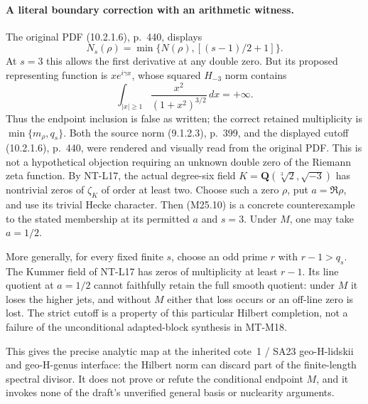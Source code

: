 \paragraph{A literal boundary correction with an arithmetic witness.}
The original PDF (10.2.1.6), p.~440, displays
\[
 N_s(\rho)=\min\{N(\rho),[(s-1)/2+1]\}.
\]
At $s=3$ this allows the first derivative at any double zero.
But its proposed representing function is
$x e^{i\gamma x}$, whose squared $H_{-3}$ norm contains
\[
              \int_{|x|\ge1}\frac{x^2}{(1+x^2)^{3/2}}\,dx
                         =+\infty.
 \tag{M25.10}
\]
Thus the endpoint inclusion is false as written; the
correct retained multiplicity is
$\min\{m_\rho,q_s\}$. Both the source norm (9.1.2.3),
p.~399, and the displayed cutoff (10.2.1.6), p.~440, were
rendered and visually read from the original PDF.
This is not a hypothetical objection requiring an unknown
double zero of the Riemann zeta function. By NT-L17,
the actual degree-six field
$K=\mathbf Q(\sqrt[3]{2},\sqrt{-3})$ has nontrivial zeros
of $\zeta_K$ of order at least two. Choose such a zero
$\rho$, put $a=\Re\rho$, and use its trivial Hecke
character. Then (M25.10) is a concrete counterexample
to the stated membership at its permitted $a$ and $s=3$.
Under $M$, one may take $a=1/2$.

More generally, for every fixed finite $s$, choose an odd
prime $r$ with $r-1>q_s$. The Kummer field of NT-L17
has zeros of multiplicity at least $r-1$. Its line quotient
at $a=1/2$ cannot faithfully retain the full smooth
quotient: under $M$ it loses the higher jets, and without
$M$ either that loss occurs or an off-line zero is lost.
The strict cutoff is a property of this particular
Hilbert completion, not a failure of the unconditional
adapted-block synthesis in MT-M18.

This gives the precise analytic map at the inherited
cote~1 / SA23 geo-H-lidskii and geo-H-genus interface:
the Hilbert norm can discard part of the finite-length
spectral divisor. It does not prove or refute the
conditional endpoint $M$, and it invokes none of the
draft's unverified general basis or nuclearity arguments.
